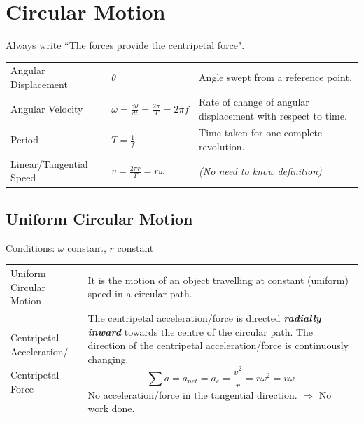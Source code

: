 \documentclass[a4paper,11pt]{article}
\begin{document}
	\section{Circular Motion}
		Always write ``The \underline{\hspace{1.5cm}} forces provide the centripetal force".
		\begin{center}
			\renewcommand{\arraystretch}{1.5}
			\begin{tabular}{@{} l l p{7cm} @{}}
				\toprule
				Angular Displacement & $\theta$ & Angle swept from a reference point. \\
				Angular Velocity & $\omega=\frac{d\theta}{dt}=\frac{2\pi}{T}=2\pi f$ & Rate of change of angular displacement with respect to time. \\
				Period & $T=\frac{1}{f}$ & Time taken for one complete revolution. \\
				Linear/Tangential Speed & $v=\frac{2\pi r}{T}=r\omega$ & \textit{(No need to know definition)}\\
				\bottomrule
			\end{tabular}
		\end{center}
		\subsection{Uniform Circular Motion}
			Conditions: $\omega$ constant, $r$ constant
			\begin{center}
				\renewcommand{\arraystretch}{1.2}
				\begin{tabular}{@{} p{3.7cm} p{10cm} @{}}
					\toprule
					Uniform Circular Motion & It is the motion of an object travelling at constant (uniform) speed in a circular path. \\
					Centripetal Acceleration/ \par Centripetal Force& The centripetal acceleration/force is directed \textbf{\textit{radially inward}} towards the centre of the circular path. The direction of the centripetal acceleration/force is continuously changing. $$\sum a = a_{net} = a_c=\frac{v^2}{r}=r\omega^2=v\omega$$ No acceleration/force in the tangential direction. $\Rightarrow$ No work done. 
					\\
					\bottomrule
				\end{tabular}
			\end{center}
\end{document}
